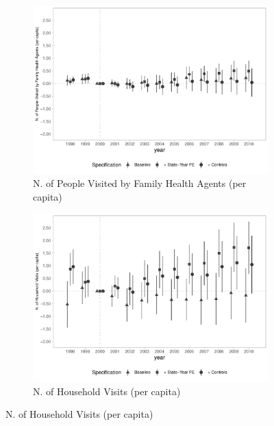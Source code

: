 \begin{figure}[h]
\begin{center}
\begin{subfigure}{0.32\textwidth}
    \end{subfigure}
    \begin{subfigure}{0.32\textwidth}
        \centering
        \caption{\scriptsize N. of People Visited by Family Health Agents (per capita)}\label{fig:access2_c}
        \includegraphics[width=\textwidth]{plots/access/siab_accomp_especif_psf_pcapita_dist_ec29_baseline_dist_ec29_baseline_full.pdf}
    \end{subfigure}
    \begin{subfigure}{0.32\textwidth}
        \centering
        \caption{\scriptsize N. of Household Visits (per capita)}\label{fig:access2_d}
        \includegraphics[width=\textwidth]{plots/access/siab_visit_cha_pcapita_dist_ec29_baseline_dist_ec29_baseline_full.pdf}
    \end{subfigure}

\end{center}
\end{figure}
